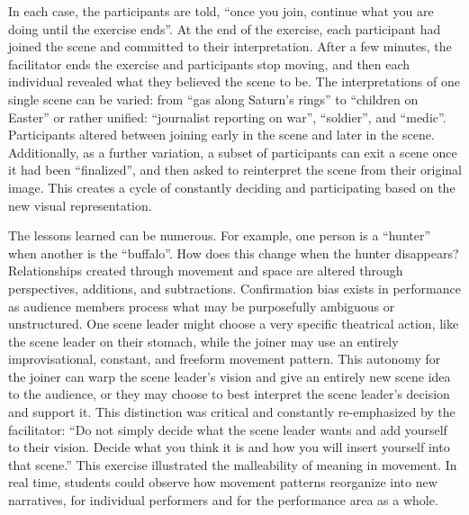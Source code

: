 \documentclass[arts,article,submit,moreauthors,pdftex,10pt,a4paper]{mdpi}
\begin{document}
In each case, the participants are told, ``once you join, continue what you are doing until the exercise ends''.   At the end of the exercise, each participant had joined the scene and committed to their interpretation.  After a few minutes, the facilitator ends the exercise and participants stop moving, and then each individual revealed what they believed the scene to be.  The interpretations of one single scene can be varied: from ``gas along Saturn’s rings'' to ``children on Easter'' or rather unified: ``journalist reporting on war'', ``soldier'', and ``medic''.  Participants altered between joining early in the scene and later in the scene.  Additionally, as a further variation, a subset of participants can exit a scene once it had been ``finalized'', and then asked to reinterpret the scene from their original image. This creates a cycle of constantly deciding and participating based on the new visual representation.  

The lessons learned can be numerous.  For example, one person is a ``hunter'' when another is the ``buffalo''.  How does this
 change when the hunter disappears?  Relationships created through movement and space are altered through perspectives, additions, and subtractions.  Confirmation bias exists in performance as audience members process what may be purposefully ambiguous or unstructured. 
 One scene leader might choose a very specific theatrical action, like the scene leader on their stomach, while the joiner may use an entirely improvisational, constant, and freeform movement pattern.  This autonomy for the joiner can warp the scene leader’s
 vision and give an entirely new scene idea to the audience, or they may choose to best interpret the scene leader’s decision and support it.  This distinction was critical and constantly re-emphasized by the facilitator: ``Do not simply decide what the scene
 leader wants and add yourself to their vision.  Decide what you think it is
and how you will insert yourself into that scene.''  This exercise illustrated the malleability of meaning in movement.  In real time, students could observe
 how movement patterns reorganize into new narratives, for individual performers and for the performance area as a whole.  
 
\end{document}
